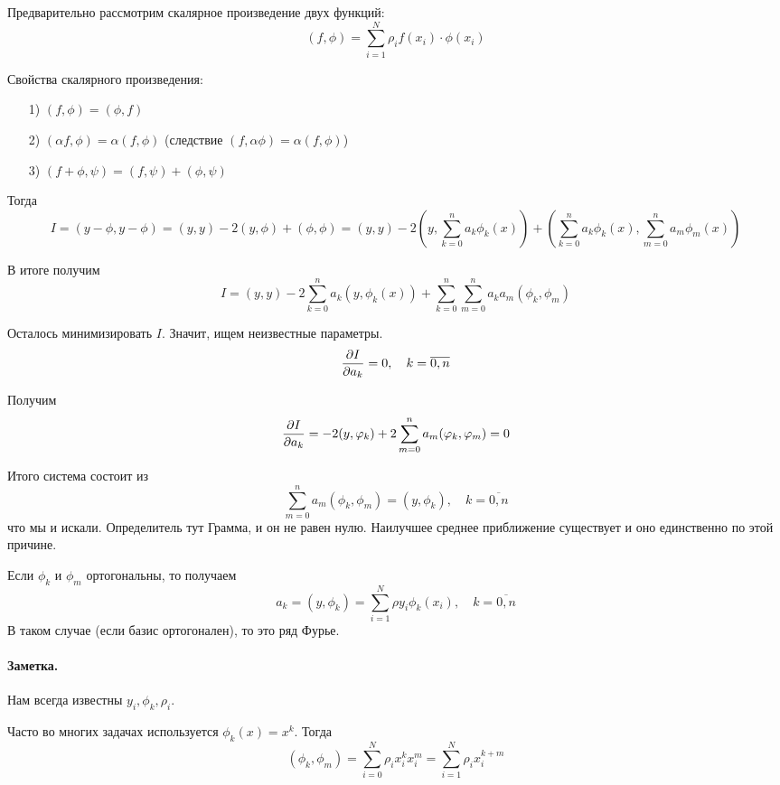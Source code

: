 \medskip

Предварительно рассмотрим скалярное произведение двух функций:
\[
    (f, \phi) = \sum\limits_{i=1}^{N}\rho_i f(x_{i}) \cdot \phi(x_{i}) 
\] 

Свойства скалярного произведения:
\begin{itemize}
    \item[1)] $(f,\phi) = (\phi, f)$
    \item[2)] $(\alpha f, \phi) = \alpha(f,\phi)$ (следствие $(f,\alpha\phi) = \alpha(f,\phi)$)
    \item[3)] $(f + \phi, \psi) = (f, \psi) + (\phi, \psi)$
\end{itemize}
Тогда
\[
I = (y - \phi, y - \phi) = (y,y) - 2(y, \phi) + (\phi, \phi) = (y, y) - 2\left(y, \sum\limits_{k=0}^{n}
                        a_k\phi_k(x)\right) + \left(\sum\limits_{k=0}^{n}a_k\phi_k(x),
                        \sum\limits_{m=0}^{n}a_m\phi_m(x)\right)
\]

В итоге получим
\[
I = (y, y) - 2 \sum\limits_{k=0}^{n}a_k\left(y, \phi_k(x)\right) +
\sum\limits_{k=0}^{n}\sum\limits_{m=0}^{n}a_k a_m(\phi_k,\phi_m)  
\]

Осталось минимизировать $I$. Значит, ищем неизвестные параметры.
 \[
     \frac{\partial I}{\partial a_k} = 0,\quad k = \overline{0,n}
\]

\medskip

Получим
\[
    \frac{\partial I}{\partial a_k} = -2(y,\varphi_k) + 2 \sum\limits_{m=0}^{n}a_m(\varphi_k,\varphi_m) = 0 
\] 

Итого система состоит из
\[
\sum\limits_{m=0}^{n}a_m(\phi_k,\phi_m) = (y,\phi_k), \quad k = \overline{0,n} 
\]
что мы и искали. Определитель тут Грамма, и он не равен нулю. Наилучшее среднее приближение
существует и оно единственно по этой причине.

Если $\phi_k$ и  $\phi_m$ ортогональны, то получаем
\begin{equation}
a_k = (y, \phi_k) = \sum\limits_{i=1}^{N}\rho y_i \phi_k(x_{i}), \quad k = \overline{0,n} 
\end{equation}
В таком случае (если базис ортогонален), то это ряд Фурье.

\paragraph*{Заметка.}
Нам всегда известны $y_i, \phi_k, \rho_i$.


\medskip

Часто во многих задачах используется $\phi_k(x) = x^{k}$. Тогда
\[
    (\phi_k, \phi_m) = \sum\limits_{i=0}^{N}\rho_i x_{i}^{k} x_{i}^{m} = \sum\limits_{i=1}^{N}\rho_i
    x_{i}^{k+m}
\]

